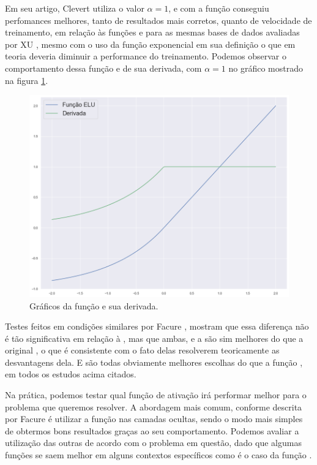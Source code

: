 Em seu artigo, Clevert \citep{clevert} utiliza o valor $\alpha = 1$, e com a função  conseguiu perfomances melhores, tanto de resultados mais corretos, quanto de velocidade de treinamento, em relação às funções  e  para as mesmas bases de dados avaliadas por XU \citep{xu_relu}, mesmo com o uso da função exponencial em sua definição o que em teoria deveria diminuir a performance do treinamento. Podemos observar o comportamento dessa função e de sua derivada, com $\alpha = 1$ no gráfico mostrado na figura \ref{fig:elu}.

\begin{figure}[htb]
\centering
\includegraphics[width=12cm]{figuras/elu}
\caption{Gráficos da função  e sua derivada.}
\label{fig:elu}
\end{figure}

Testes feitos em condições similares por Facure \citep{matheus}, mostram que essa diferença não é tão significativa em relação à , mas que ambas,  e a  são sim melhores do que a original , o que é consistente com o fato delas resolverem teoricamente as desvantagens dela. E são todas obviamente melhores escolhas do que a função , em todos os estudos acima citados.

Na prática, podemos testar qual função de ativação irá performar melhor para o problema que queremos resolver. A abordagem mais comum, conforme descrita por Facure \citep{matheus} é utilizar a função  nas camadas ocultas, sendo o modo mais simples de obtermos bons resultados graças ao seu comportamento. Podemos avaliar a utilização das outras de acordo com o problema em questão, dado que algumas funções se saem melhor em alguns contextos específicos como é o caso da função .

